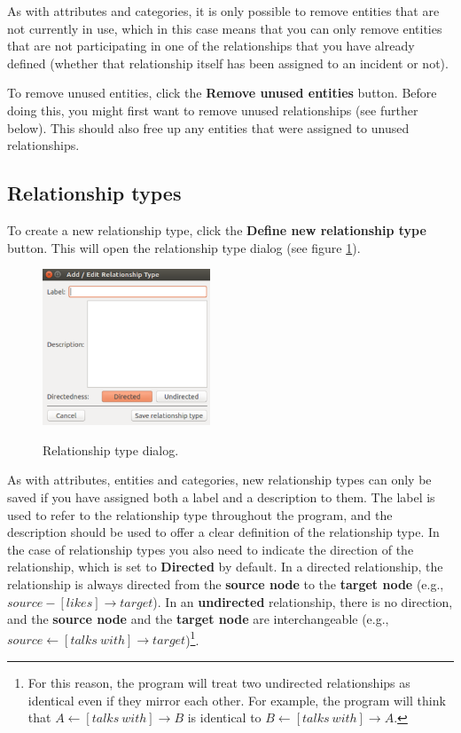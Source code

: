 \documentclass{memoir}
\begin{document}
As with attributes and categories, it is only possible to remove entities that are not currently in use, which in this case means that you can only remove entities that are not participating in one of the relationships that you have already defined (whether that relationship itself has been assigned to an incident or not).

To remove unused entities, click the \textbf{Remove unused entities} button. Before doing this, you might first want to remove unused relationships (see further below). This should also free up any entities that were assigned to unused relationships.

\subsection{Relationship types}
\label{sec:relationshiptypes}

To create a new relationship type, click the \textbf{Define new relationship type} button. This will open the relationship type dialog (see figure \ref{fig:relationshiptypedialog}). 

\begin{figure}[h!]
  \centering
  \caption{Relationship type dialog.}
  \includegraphics[width=50mm]{Screenshot_17.pdf}
  \label{fig:relationshiptypedialog}
\end{figure}

As with attributes, entities and categories, new relationship types can only be saved if you have assigned both a label and a description to them. The label is used to refer to the relationship type throughout the program, and the description should be used to offer a clear definition of the relationship type. In the case of relationship types you also need to indicate the direction of the relationship, which is set to \textbf{Directed} by default. In a directed relationship, the relationship is always directed from the \textbf{source node} to the \textbf{target node} (e.g., \(source-[likes]\rightarrow target\)). In an \textbf{undirected} relationship, there is no direction, and the \textbf{source node} and the \textbf{target node} are interchangeable (e.g., \(source\leftarrow [talks\ with]\rightarrow target\))\footnote{For this reason, the program will treat two undirected relationships as identical even if they mirror each other. For example, the program will think that \(A\leftarrow [talks\ with]\rightarrow B\) is identical to \(B\leftarrow [talks\ with]\rightarrow A\).}. 
\end{document}
